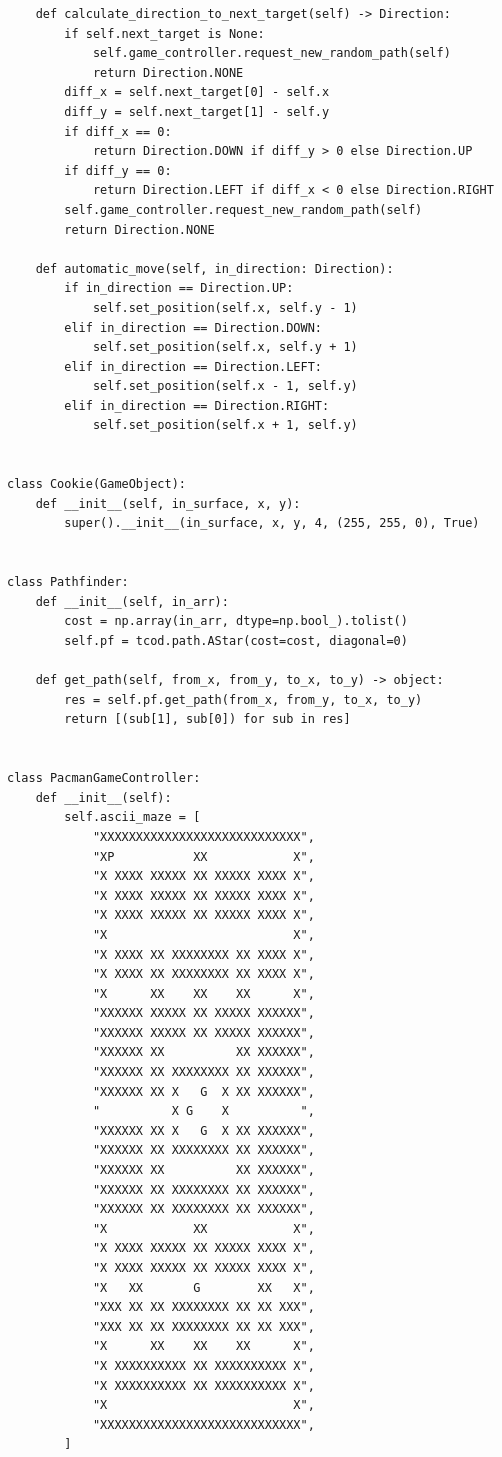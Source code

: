 \documentclass[a4paper,14pt]{extarticle}
\begin{document}
\begin{verbatim}
    def calculate_direction_to_next_target(self) -> Direction:
        if self.next_target is None:
            self.game_controller.request_new_random_path(self)
            return Direction.NONE
        diff_x = self.next_target[0] - self.x
        diff_y = self.next_target[1] - self.y
        if diff_x == 0:
            return Direction.DOWN if diff_y > 0 else Direction.UP
        if diff_y == 0:
            return Direction.LEFT if diff_x < 0 else Direction.RIGHT
        self.game_controller.request_new_random_path(self)
        return Direction.NONE

    def automatic_move(self, in_direction: Direction):
        if in_direction == Direction.UP:
            self.set_position(self.x, self.y - 1)
        elif in_direction == Direction.DOWN:
            self.set_position(self.x, self.y + 1)
        elif in_direction == Direction.LEFT:
            self.set_position(self.x - 1, self.y)
        elif in_direction == Direction.RIGHT:
            self.set_position(self.x + 1, self.y)


class Cookie(GameObject):
    def __init__(self, in_surface, x, y):
        super().__init__(in_surface, x, y, 4, (255, 255, 0), True)


class Pathfinder:
    def __init__(self, in_arr):
        cost = np.array(in_arr, dtype=np.bool_).tolist()
        self.pf = tcod.path.AStar(cost=cost, diagonal=0)

    def get_path(self, from_x, from_y, to_x, to_y) -> object:
        res = self.pf.get_path(from_x, from_y, to_x, to_y)
        return [(sub[1], sub[0]) for sub in res]


class PacmanGameController:
    def __init__(self):
        self.ascii_maze = [
            "XXXXXXXXXXXXXXXXXXXXXXXXXXXX",
            "XP           XX            X",
            "X XXXX XXXXX XX XXXXX XXXX X",
            "X XXXX XXXXX XX XXXXX XXXX X",
            "X XXXX XXXXX XX XXXXX XXXX X",
            "X                          X",
            "X XXXX XX XXXXXXXX XX XXXX X",
            "X XXXX XX XXXXXXXX XX XXXX X",
            "X      XX    XX    XX      X",
            "XXXXXX XXXXX XX XXXXX XXXXXX",
            "XXXXXX XXXXX XX XXXXX XXXXXX",
            "XXXXXX XX          XX XXXXXX",
            "XXXXXX XX XXXXXXXX XX XXXXXX",
            "XXXXXX XX X   G  X XX XXXXXX",
            "          X G    X          ",
            "XXXXXX XX X   G  X XX XXXXXX",
            "XXXXXX XX XXXXXXXX XX XXXXXX",
            "XXXXXX XX          XX XXXXXX",
            "XXXXXX XX XXXXXXXX XX XXXXXX",
            "XXXXXX XX XXXXXXXX XX XXXXXX",
            "X            XX            X",
            "X XXXX XXXXX XX XXXXX XXXX X",
            "X XXXX XXXXX XX XXXXX XXXX X",
            "X   XX       G        XX   X",
            "XXX XX XX XXXXXXXX XX XX XXX",
            "XXX XX XX XXXXXXXX XX XX XXX",
            "X      XX    XX    XX      X",
            "X XXXXXXXXXX XX XXXXXXXXXX X",
            "X XXXXXXXXXX XX XXXXXXXXXX X",
            "X                          X",
            "XXXXXXXXXXXXXXXXXXXXXXXXXXXX",
        ]


\end{verbatim}
\end{document}
